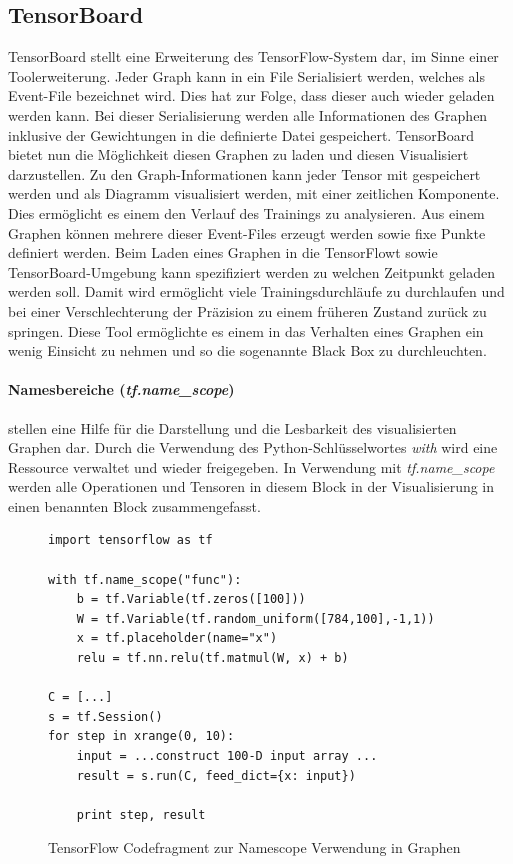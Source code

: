 \subsection{TensorBoard}

TensorBoard stellt eine Erweiterung des TensorFlow-System dar, im Sinne einer Toolerweiterung. 
Jeder Graph kann in ein File Serialisiert werden, welches als Event-File bezeichnet wird. 
Dies hat zur Folge, dass dieser auch wieder geladen werden kann. 
Bei dieser Serialisierung werden alle Informationen des Graphen inklusive der Gewichtungen in die definierte Datei gespeichert.
TensorBoard bietet nun die Möglichkeit diesen Graphen zu laden und diesen Visualisiert darzustellen.
Zu den Graph-Informationen kann jeder Tensor mit gespeichert werden und als Diagramm visualisiert werden, mit einer zeitlichen Komponente. 
Dies ermöglicht es einem den Verlauf des Trainings zu analysieren. 
Aus einem Graphen können mehrere dieser Event-Files erzeugt werden sowie fixe Punkte definiert werden. 
Beim Laden eines Graphen in die TensorFlowt sowie TensorBoard-Umgebung kann spezifiziert werden zu welchen Zeitpunkt geladen werden soll. 
Damit wird ermöglicht viele Trainingsdurchläufe zu durchlaufen und bei einer Verschlechterung der Präzision zu einem früheren Zustand zurück zu springen.
Diese Tool ermöglichte es einem in das Verhalten eines Graphen ein wenig Einsicht zu nehmen und so die sogenannte Black Box zu durchleuchten. 

\paragraph{Namesbereiche (\textit{tf.name\_scope})} stellen eine Hilfe für die Darstellung und die Lesbarkeit des visualisierten Graphen dar. 
Durch die Verwendung des Python-Schlüsselwortes \textit{with} wird eine Ressource verwaltet und wieder freigegeben. 
In Verwendung mit \textit{tf.name\_scope} werden alle Operationen und Tensoren in diesem Block in der Visualisierung in einen benannten Block zusammengefasst.

\begin{figure}

\lstset{language=Python}
\begin{lstlisting}
import tensorflow as tf

with tf.name_scope("func"):
	b = tf.Variable(tf.zeros([100])) 
	W = tf.Variable(tf.random_uniform([784,100],-1,1)) 
	x = tf.placeholder(name="x") 
	relu = tf.nn.relu(tf.matmul(W, x) + b) 

C = [...] 
s = tf.Session()
for step in xrange(0, 10):
	input = ...construct 100-D input array ... 
	result = s.run(C, feed_dict={x: input}) 

	print step, result 
\end{lstlisting}

	\caption{TensorFlow Codefragment zur Namescope Verwendung in Graphen}
	\label{fig:NameScopeFragmentGraphDefinition}
\end{figure}
\phantom \newline


